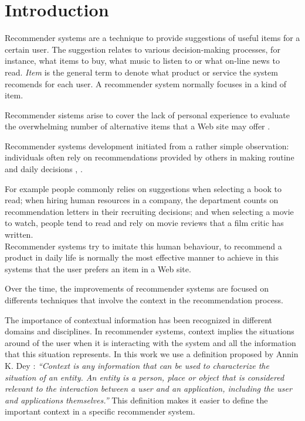 \chapter{Introduction} \label{introduction} 

Recommender systems are a technique to provide suggestions of 
useful items for a certain user. The suggestion relates to various
decision-making processes, for instance, what items to buy, what music
to listen to or what on-line news to read. \textit{Item} is the general
term to denote what product or service  the system recomends for each
user. A recommender system normally focuses in a kind of item.

Recommender sistems arise to cover the lack of personal experience to
evaluate the overwhelming number of alternative items that a Web site
may offer \cite{resnick1997recommender}.

Recommender systems development initiated from a rather simple
observation: individuals often rely on recommendations provided by
others in making routine and daily decisions \cite{mahmood2009improving},
\cite{mcsherry2009differentially}. 

For example people commonly relies on suggestions when selecting a
book to read; when hiring human resources in a company, the department
counts on recommendation letters in their recruiting decisions; and
when selecting a movie to watch, people tend to read and rely on 
movie reviews that a film critic has written.\\

Recommender systems try to imitate this human behaviour, to
recommend a product in daily life is normally the most effective
manner to achieve in this systems that the user prefers an item in a
Web site.

Over the time, the improvements of recommender systems are
focused on differents techniques that involve the context in the
recommendation process. 

The importance of contextual information has
been recognized in different domains and disciplines. %
In recommender
systems, context implies the situations around of the user when it is %
interacting with the system and all the information that this
situation represents. 
In this work we use a definition proposed by Annin K.
Dey \cite{dey2001understanding}: \textit{``Context is any information
that can be used to characterize the situation of an entity. An entity
is a person, place or object that is considered relevant to the
interaction between a user and an application, including the user and
applications themselves.''} 
This definition makes it easier to define
the important context in a specific recommender system.\\  %

